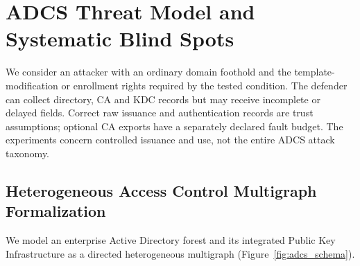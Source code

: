 \section{ADCS Threat Model and Systematic Blind Spots}
\label{sec:threat_model}

We consider an attacker with an ordinary domain foothold and the template-modification or enrollment rights required by the tested condition. The defender can collect directory, CA and KDC records but may receive incomplete or delayed fields. Correct raw issuance and authentication records are trust assumptions; optional CA exports have a separately declared fault budget. The experiments concern controlled issuance and use, not the entire ADCS attack taxonomy.

\subsection{Heterogeneous Access Control Multigraph Formalization}
We model an enterprise Active Directory forest and its integrated Public Key Infrastructure as a directed heterogeneous multigraph (Figure~\ref{fig:adcs_schema}).

